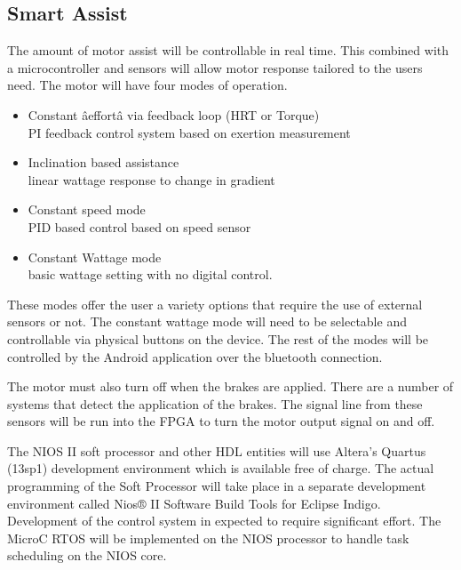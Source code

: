 \documentclass[12pt,article]{IEEEtran}
\begin{document}
	\subsection{Smart Assist}
    	The amount of motor assist will be controllable in real time. This combined with a microcontroller 
        and sensors will allow motor response tailored to the users need. The motor will have four modes of operation.
    	\begin{itemize}
    	\item Constant âeffortâ via feedback loop (HRT or Torque) \hfill \\
            PI feedback control system based on exertion measurement
    
    	\item Inclination based assistance \hfill \\
    	   linear wattage response to change in gradient
    
    	\item Constant speed mode \hfill \\
    		PID based control based on speed sensor
    
    	\item Constant Wattage mode \hfill \\
    	 basic wattage setting with no digital control.
    	\end{itemize}
    	
    	These modes offer the user a variety options that require the use of external sensors or not. The constant
        wattage mode will need to be selectable and controllable via physical buttons on the device. The rest of the
        modes will be controlled by the Android application over the bluetooth connection.
        
    	The motor must also turn off when the brakes are applied. There are a number of systems that detect the application
        of the brakes. The signal line from these sensors will be run into the FPGA to turn the motor output signal on and off. 
        
    	The NIOS II soft processor and other HDL entities will use Altera's Quartus (13sp1) development
        environment which is available free of charge. The actual programming of the Soft Processor will take place in a separate 
		development environment called Nios® II Software Build Tools for Eclipse Indigo. Development of the control system in 
		expected to require significant effort. The MicroC RTOS will be implemented on the NIOS processor to handle task scheduling on the NIOS core. 
\end{document}
